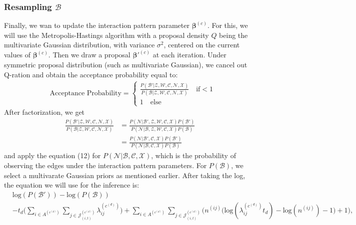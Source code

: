 \documentclass[a4paper]{article}
\begin{document}
\subsubsection{Resampling $\mathcal{B}$}
Finally, we wan to update the interaction pattern parameter $\boldsymbol{\beta}^{(c)}$. For this, we will use the Metropolis-Hastings algorithm with a proposal density $Q$ being the multivariate Gaussian distribution, with variance $\sigma^2$, centered on the current values of $\boldsymbol{\beta}^{(c)}$. Then we draw a proposal $\boldsymbol{\beta}'^{(c)}$ at each iteration. Under symmetric proposal distribution (such as multivariate Gaussian), we cancel out Q-ration and obtain the acceptance probability equal to:
\begin{equation}
\begin{split}
& \mbox{Acceptance Probability}=
\begin{cases}  \frac{P(\mathcal{B'}|\mathcal{Z}, \mathcal{W}, \mathcal{C}, \mathcal{N}, \mathcal{X})}{P(\mathcal{B}|\mathcal{Z}, \mathcal{W}, \mathcal{C}, \mathcal{N}, \mathcal{X})}\quad\text{if}  <1\\
1 \quad \text{else}
\end{cases}
\end{split}
\end{equation}
After factorization, we get
\begin{equation}
\begin{aligned}
\frac{P(\mathcal{B'}|\mathcal{Z}, \mathcal{W}, \mathcal{C}, \mathcal{N}, \mathcal{X})}{P(\mathcal{B}|\mathcal{Z}, \mathcal{W}, \mathcal{C}, \mathcal{N}, \mathcal{X})} &=\frac{P(\mathcal{N}|\mathcal{B'}, \mathcal{Z}, \mathcal{W}, \mathcal{C}, \mathcal{X})P(\mathcal{B'})}{P(\mathcal{N}|\mathcal{B}, \mathcal{Z}, \mathcal{W}, \mathcal{C}, \mathcal{X})P(\mathcal{B})}\\&=\frac{P(\mathcal{N}|\mathcal{B'}, \mathcal{C}, \mathcal{X})P(\mathcal{B'})}{P(\mathcal{N}|\mathcal{B}, \mathcal{C}, \mathcal{X})P(\mathcal{B})}
\end{aligned}
\end{equation}
and apply the equation (12) for $P(\mathcal{N}|\mathcal{B}, \mathcal{C}, \mathcal{X})$, which is the probability of observing the edges under the interaction pattern parameters. For $P(\mathcal{B})$, we select a multivarate Gaussian priors as mentioned earlier. After taking the log, the equation we will use for the inference is:
	\begin{equation}
	\begin{aligned} 
	&\mbox{log}(P(\mathcal{B'}))-\mbox{log}(P(\mathcal{B}))\\&-t_d\big(\sum\limits_{i \in A^{(c^{(d)})}}\sum\limits_{j\in \mathcal{J}^{(c^{(d)})}_{(i, t)}}\lambda_{ij}^{(c^{(d)})}\big)+\sum_{i \in A^{(c^{(d)})}}\sum_{j\in \mathcal{J}^{(c^{(d)})}_{(i, t)}}\Big(n^{(ij)}\big(\mbox{log}(\lambda_{ij}^{(c^{(d)})}t_d)-\mbox{log}(n^{(ij)})-1\big)+1\Big), 
	\end{aligned}
	\end{equation}
\end{document}
